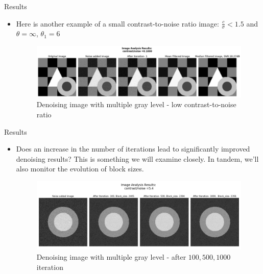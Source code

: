 \documentclass{beamer}
\begin{document}
\begin{frame}{Results}

    \begin{itemize}
\item Here is another example of a small contrast-to-noise ratio image:  $\frac{c}{\sigma}<1.5 $ and $\theta = \infty$, $\theta_1 = 6$

\begin{figure}[h] %
	\centering
	
	\includegraphics[width=1\linewidth]{img/hardone_2.png}
	\caption{Denoising image with multiple gray level - low contrast-to-noise ratio }
	\label{fig: low contrast-to-noise ratio 2}
\end{figure}

    \end{itemize}
\end{frame}

\begin{frame}{Results}

    \begin{itemize}
\item  Does an increase in the number of iterations lead to significantly improved denoising results? This is something we will examine closely. In tandem, we'll also monitor the evolution of block sizes.  
	
	\begin{figure}[H] %
		\centering
		
		\includegraphics[width=1\linewidth]{img/block.png}
		\caption{Denoising image with multiple gray level - after $100,500,1000$ iteration  }
		\label{fig: after $100,500,1000$ iteration }
	\end{figure}

    \end{itemize}
\end{frame}
\end{document}
